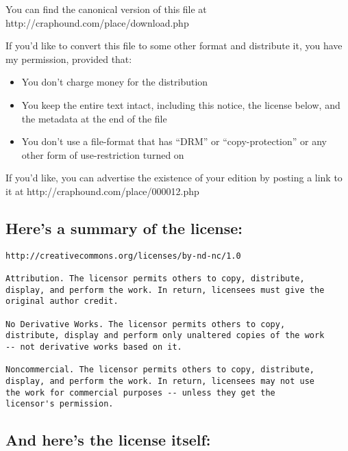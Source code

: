 You can find the canonical version of this file at\\
http://craphound.com/place/download.php

If you'd like to convert this file to some other format and
distribute it, you have my permission, provided that:

\begin{itemize}
\item
  You don't charge money for the distribution

\item
  You keep the entire text intact, including this notice, the license
  below, and the metadata at the end of the file

\item
  You don't use a file-format that has ``DRM'' or ``copy-protection''
  or any other form of use-restriction turned on

\end{itemize}
If you'd like, you can advertise the existence of your edition by
posting a link to it at http://craphound.com/place/000012.php


\subsection{Here's a summary of the license:}

\begin{verbatim}
http://creativecommons.org/licenses/by-nd-nc/1.0

Attribution. The licensor permits others to copy, distribute,
display, and perform the work. In return, licensees must give the
original author credit.

No Derivative Works. The licensor permits others to copy,
distribute, display and perform only unaltered copies of the work
-- not derivative works based on it.

Noncommercial. The licensor permits others to copy, distribute,
display, and perform the work. In return, licensees may not use
the work for commercial purposes -- unless they get the
licensor's permission.
\end{verbatim}

\subsection{And here's the license itself:}

